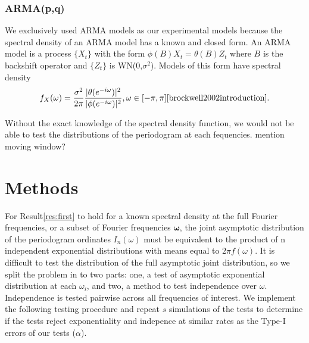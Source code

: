 \documentclass{article}\usepackage{graphicx, color}
\newcommand{\mj}[1]{{\color{blue} #1}}
\theoremstyle{plain}
\begin{document}
\subsubsection*{ARMA(p,q)}
We exclusively used ARMA models as our experimental models because the spectral density of an ARMA model has a known and closed form. An ARMA model is a process $\{X_t\}$ with the form $\phi(B)X_t = \theta(B)Z_t$ where $B$ is the backshift operator and $\{Z_t\}$ is WN(0,$\sigma^2$). Models of this form have spectral density
\begin{align}
f_X(\omega) = \frac{\sigma^2}{2\pi} \frac{|\theta(e^{-i \omega})|^2}{|\phi(e^{-i \omega})|^2}, \omega \in [-\pi, \pi] \text{\cite{brockwell2002introduction}}.
\end{align}

Without the exact knowledge of the spectral density function, we would not be able to test the distributions of the periodogram at each fequencies. \mj{mention moving window?}


\section{Methods}


For Result\ref{res:first} to hold for a known spectral density at the full Fourier frequencies, or a subset of Fourier frequencies $\boldsymbol{\omega}$, the joint asymptotic distribution of the periodogram ordinates $I_n(\omega)$ must be equivalent to the product of n independent exponential distributions with means equal to $2\pi f(\omega)$. It is difficult to test the distribution of the full asymptotic joint distribution, so we split the problem in to two parts: one, a test of asymptotic exponential distribution at each $\omega_i$, and two, a method to test independence over $\omega$. Independence is tested pairwise across all frequencies of interest. We implement the following testing procedure and repeat $s$ simulations of the tests to determine if the tests reject exponentiality and indepence at similar rates as the Type-I errors of our tests ($\alpha$).
\end{document}
